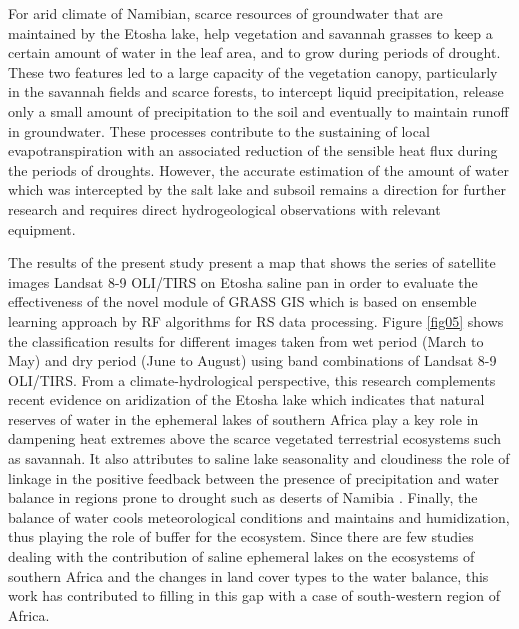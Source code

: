 \documentclass[climate,article,submit,pdftex,moreauthors]{Definitions/mdpi}
\begin{document}
{For arid climate of Namibian, scarce resources of groundwater that are maintained by the Etosha lake, help vegetation and savannah grasses to keep a certain amount of water in the leaf area, and to grow during periods of drought. These two features led to a large capacity of the vegetation canopy, particularly in the savannah fields and scarce forests, to intercept liquid precipitation, release only a small amount of precipitation to the soil and eventually to maintain runoff in groundwater. These processes contribute to the sustaining of local evapotranspiration with an associated reduction of the sensible heat flux during the periods of droughts. However, the accurate estimation of the amount of water which was intercepted by the salt lake and subsoil remains a direction for further research and requires direct hydrogeological observations with relevant equipment.}

The results of the present study present a map that shows the series of satellite images Landsat 8-9 OLI/TIRS on Etosha saline pan in order to evaluate the effectiveness of the novel module of GRASS GIS which is based on ensemble learning approach by RF algorithms for RS data processing. Figure \ref{fig05} shows the classification results for different images taken from wet period (March to May) and dry period (June to August) using band combinations of Landsat 8-9 OLI/TIRS. {From a climate-hydrological perspective, this research complements recent evidence on aridization of the Etosha lake which indicates that natural reserves of water in the ephemeral lakes of southern Africa play a key role in dampening heat extremes above the scarce vegetated terrestrial ecosystems such as savannah. It also attributes to saline lake seasonality and cloudiness the role of linkage in the positive feedback between the presence of precipitation and water balance in regions prone to drought such as deserts of Namibia} \cite{MORETTI202235588,WENBORN2025105309}. {Finally, the balance of water cools meteorological conditions and maintains and humidization, thus playing the role of buffer for the ecosystem. Since there are few studies dealing with the contribution of saline ephemeral lakes on the ecosystems of southern Africa and the changes in land cover types to the water balance, this work has contributed to filling in this gap with a case of south-western region of Africa.}
\end{document}
